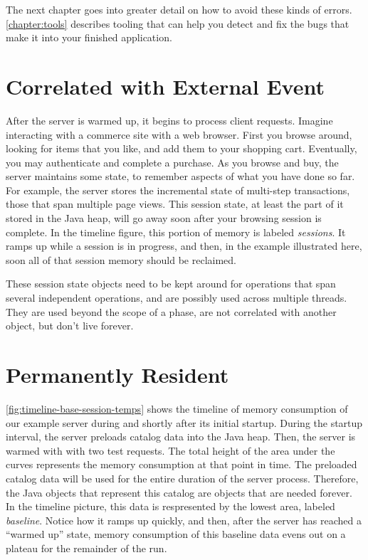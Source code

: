 The next chapter goes into greater detail on how to avoid these kinds of
errors. \autoref{chapter:tools} describes tooling that can help you
detect and fix the bugs that make it into your finished application.


\section{Correlated with External Event}
\label{sec:correlated-with-need}

After the server is warmed up, it begins to process client requests. Imagine
interacting with a commerce site with a web browser. First you browse around,
looking for items that you like, and add them to your shopping cart. Eventually,
you may authenticate and complete a purchase. As you browse and buy, the server
maintains some state, to remember aspects of what you have done so far. For
example, the server stores the incremental state of multi-step transactions,
those that span multiple page views. This session state, at least the part of it
stored in the Java heap, will go away soon after your browsing session is
complete. In the timeline figure, this portion of memory is labeled
\emph{sessions}. It ramps up while a session is in progress, and then, in the
example illustrated here, soon all of that session memory should be reclaimed.

These session state objects need to be kept around for operations that span
several independent operations, and are possibly used across multiple threads.
They are used beyond the scope of a phase, are not correlated with another
object, but don't live forever.

\section{Permanently Resident}
\label{sec:forever-lifetime}

\autoref{fig:timeline-base-session-temps} shows the timeline of memory
consumption of our example server 
during and shortly after its initial startup.
During the startup interval, the server preloads catalog data into
the Java heap. Then, the server is warmed with with two test requests.
The total height of the area
under the curves represents the memory consumption at that point in time. 
The preloaded catalog
data will be used for the entire duration of the server process.
Therefore, the Java objects that represent this catalog are objects that are
needed forever. In the timeline picture, this data is respresented by the lowest area, labeled
\emph{baseline}. Notice how it ramps up quickly, and then, after the server has
reached a ``warmed up'' state, memory consumption of this baseline data evens out
on a plateau for the remainder of the run.

